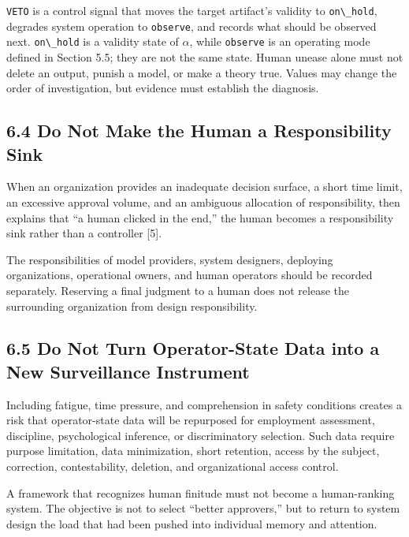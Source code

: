 \passthrough{\lstinline!VETO!} is a control signal that moves the target artifact's validity to \passthrough{\lstinline!on\_hold!}, degrades system operation to \passthrough{\lstinline!observe!}, and records what should be observed next. \passthrough{\lstinline!on\_hold!} is a validity state of \(\alpha\), while \passthrough{\lstinline!observe!} is an operating mode defined in Section 5.5; they are not the same state. Human unease alone must not delete an output, punish a model, or make a theory true. Values may change the order of investigation, but evidence must establish the diagnosis.

\subsection{6.4 Do Not Make the Human a Responsibility Sink}\label{do-not-make-the-human-a-responsibility-sink}

When an organization provides an inadequate decision surface, a short time limit, an excessive approval volume, and an ambiguous allocation of responsibility, then explains that ``a human clicked in the end,'' the human becomes a responsibility sink rather than a controller {[}5{]}.

The responsibilities of model providers, system designers, deploying organizations, operational owners, and human operators should be recorded separately. Reserving a final judgment to a human does not release the surrounding organization from design responsibility.

\subsection{6.5 Do Not Turn Operator-State Data into a New Surveillance Instrument}\label{do-not-turn-operator-state-data-into-a-new-surveillance-instrument}

Including fatigue, time pressure, and comprehension in safety conditions creates a risk that operator-state data will be repurposed for employment assessment, discipline, psychological inference, or discriminatory selection. Such data require purpose limitation, data minimization, short retention, access by the subject, correction, contestability, deletion, and organizational access control.

A framework that recognizes human finitude must not become a human-ranking system. The objective is not to select ``better approvers,'' but to return to system design the load that had been pushed into individual memory and attention.

